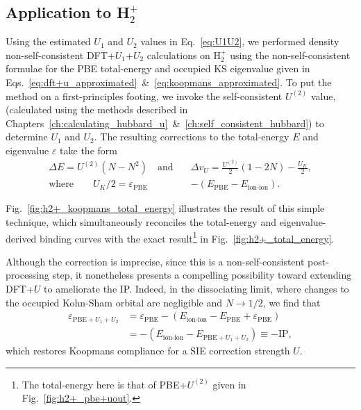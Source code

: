 \subsection{Application to H$_2^+$}
\label{sec:h2+_with_dft+u1+u2}

Using the estimated $U_1$ and $U_2$ values in Eq.~\eqref{eq:U1U2}, 
we performed density non-self-consistent 
DFT+$U_1$+$U_2$ calculations on H$_2^+$ 
using the non-self-consistent formulae 
for the PBE total-energy 
and occupied KS eigenvalue 
given in 
Eqs.~\eqref{eq:dft+u_approximated}~\&~\eqref{eq:koopmans_approximated}.
%
To put the method on a first-principles footing, 
we invoke the self-consistent $U^{(2)}$ value, 
(calculated using the methods described 
in Chapters~\ref{ch:calculating_hubbard_u}~\&~\ref{ch:self_consistent_hubbard}) 
to determine $U_1$ and $U_2$.
%
The resulting corrections to the 
total-energy $E$ and eigenvalue $\varepsilon$ take the form 
%
\begin{align}
\Delta E = U^{(2)} (N - N^2)
\quad\mbox{and}\quad&
\Delta v_U =  \frac{U^{(2)}}{2} (1 -2N) - \frac{U_K}{2}, \nonumber \\[0.5em]
\mbox{where}\quad\quad
U_K/2= \varepsilon_\textrm{PBE}&-(E_\textrm{PBE}-E_\textrm{ion-ion}) .
\end{align}

Fig.~\ref{fig:h2+_koopmans_total_energy} 
illustrates the result of this simple technique, 
which simultaneously reconciles the 
total-energy and eigenvalue-derived 
binding curves with the 
exact result\footnote{
The total-energy here is that of PBE+$U^{(2)}$ 
given in Fig.~\ref{fig:h2+_pbe+uout}.} 
in Fig.~\ref{fig:h2+_total_energy}.
%

Although the correction is imprecise, 
since this is a non-self-consistent post-processing step, 
it nonetheless presents a compelling possibility 
toward extending DFT+$U$ 
to ameliorate the IP.
%
Indeed, in the dissociating limit, 
where changes to the occupied Kohn-Sham 
orbital are negligible and $N\to1/2$, 
we find that
%
\begin{align}
\varepsilon_{\textrm{PBE}+U_1+U_2} 
&= \varepsilon_\textrm{PBE} - ( E_\textrm{ion-ion} - E_\textrm{PBE} + \varepsilon_\textrm{PBE}) \nonumber \\
&= - ( E_\textrm{ion-ion} - E_{\textrm{PBE}+U_1+U_2} )\equiv - \textrm{IP}, 
\end{align}
%
which restores Koopmans compliance 
for a SIE correction strength $U$.


